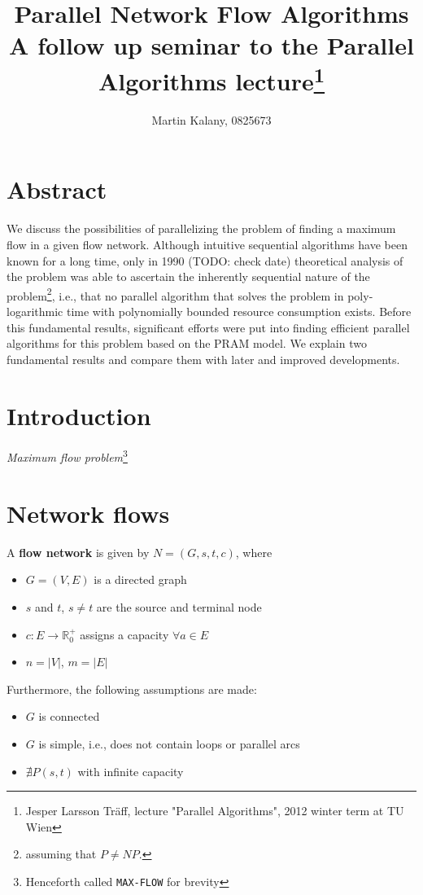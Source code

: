 \documentclass[a4paper,10pt, twocolumn]{article}
\title{Parallel Network Flow Algorithms \\ 
\large A follow up seminar to the Parallel Algorithms lecture\footnote{Jesper Larsson Träff, lecture "Parallel Algorithms", 2012 winter term at TU Wien}}
\author{Martin Kalany, 0825673}
\begin{document}
\maketitle

\section{Abstract}
\label{sec:abstract}
We discuss the possibilities of parallelizing the problem of finding a maximum flow in a given flow network. Although intuitive sequential algorithms have been known for a long time, only in 1990 (TODO: check date) theoretical analysis of the problem was able to ascertain the inherently sequential nature of the problem\footnote{ assuming that $P \neq NP$.}, i.e., that no parallel algorithm that solves the problem in poly-logarithmic time with polynomially bounded resource consumption exists. Before this fundamental results, significant efforts were put into finding efficient parallel algorithms for this problem based on the PRAM model. We explain two fundamental results and compare them with later and improved developments.


\section{Introduction}
\label{sec:intro}
\emph{Maximum flow problem}\footnote{Henceforth called \lstinline|MAX-FLOW| for brevity}


\section{Network flows}
\label{sec:networkFlows}
A \textbf{flow network} \cite{ahuja93} is given by $N = (G,s,t,c)$, where
\begin{itemize}
	\item $G =(V,E)$ is a directed graph
    \item $s$ and $t$, $s \neq t$ are the source and terminal node
   	\item $c:E\rightarrow \mathbb{R}_0^{+}$ assigns a capacity $\forall a \in E$
   	\item $n=\lvert V\rvert$, $m=\lvert E\rvert$
\end{itemize}

Furthermore, the following assumptions are made:
\begin{itemize}
	\item $G$ is connected
	\item $G$ is simple, i.e., does not contain loops or parallel arcs
	\item $\nexists P(s,t)$ with infinite capacity
\end{itemize}
\end{document}
